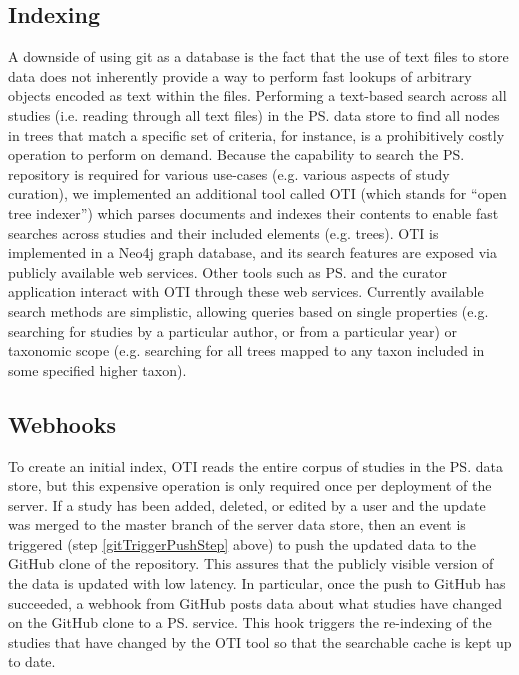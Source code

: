 \begin{methods}
\subsection*{Indexing}
A downside of using git as a database is the fact that the use of text files to store data does not inherently
    provide a way to perform fast lookups of arbitrary objects encoded as text within the files.
Performing a text-based search across all studies (i.e. reading through all \nexson text files) in the \ps data store to find all nodes
    in trees that match a specific set of criteria, for instance, is a prohibitively costly operation to perform on demand.
Because the capability to search the \ps repository is required for various use-cases (e.g. various aspects of
    study curation), we implemented an additional tool called OTI (which stands for ``open tree indexer'') which parses \nexson
    documents and indexes their contents to enable fast searches across studies and their included elements (e.g. trees).
OTI is implemented in a Neo4j graph database, and its search features are exposed via publicly available web services.
Other \otol tools such as \ps and the curator application interact with OTI through these web services.
Currently available search methods are simplistic, allowing queries based on single properties (e.g. searching for studies
    by a particular author, or from a particular year) or taxonomic scope (e.g. searching for all trees mapped to
    any taxon included in some specified higher taxon).


\subsection*{Webhooks}
To create an initial index, OTI reads the entire corpus of studies in the \ps data store, but this expensive operation
    is only required once per deployment of the server.
If a study has been added, deleted, or edited by a user and the update was merged to the master branch of the server data store,
    then an event is triggered (step \ref{gitTriggerPushStep} above) to push the updated data to the GitHub clone
    of the repository.
This assures that the publicly visible version of the data is updated
    with low latency.
In particular, once the push to GitHub has succeeded, a webhook from GitHub posts data about what studies have changed
    on the GitHub clone to a \ps service.
This hook triggers the re-indexing of the studies that have changed by the OTI tool so that the searchable cache is
    kept up to date.


\end{methods}
